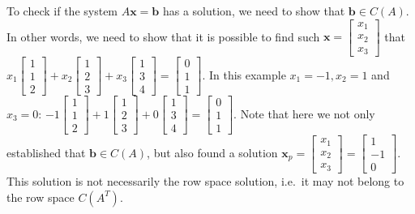 \documentclass{acm_proc_article-sp}
\begin{document}
To check if the system \(A \mathbf x = \mathbf b\) has a solution, we need to show that \(\mathbf b \in C(A)\). In other words, we need to show that it is possible to find such \(\mathbf x = \begin{bmatrix} x_1 \\ x_2 \\ x_3 \end{bmatrix}\) that \(x_1 \begin{bmatrix} 1 \\ 1 \\ 2 \end{bmatrix} + x_2 \begin{bmatrix} 1 \\ 2 \\ 3 \end{bmatrix} + x_3 \begin{bmatrix} 1 \\ 3 \\ 4 \end{bmatrix} = \begin{bmatrix} 0 \\ 1 \\ 1 \end{bmatrix}\).
In this example $x_1 = -1, x_2 = 1$ and $x_3 = 0$:
\(-1 \begin{bmatrix} 1 \\ 1 \\ 2 \end{bmatrix} + 1 \begin{bmatrix} 1 \\ 2 \\ 3 \end{bmatrix} + 0 \begin{bmatrix} 1 \\ 3 \\ 4 \end{bmatrix} = \begin{bmatrix} 0 \\ 1 \\ 1 \end{bmatrix}\).
Note that here we not only established that \(\mathbf b \in C(A)\), but also found a solution
\(\mathbf x_p = \begin{bmatrix} x_1 \\ x_2 \\ x_3 \end{bmatrix} = \begin{bmatrix} 1 \\ -1 \\ 0 \end{bmatrix}\). This solution is not necessarily the row space solution, i.e.~it may not belong to the row space \(C(A^T)\).
\end{document}
